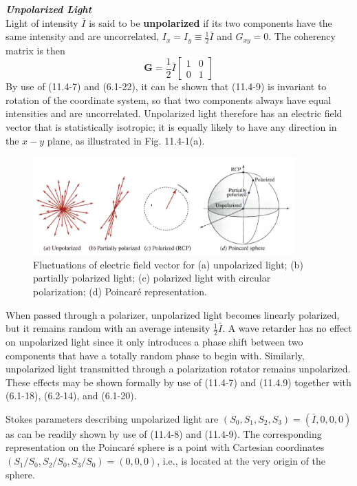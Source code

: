 \documentclass{article}
\numberwithin{figure}{subsection}
\numberwithin{table}{subsection}
\begin{document}
\bigbreak\noindent\textcolor{ksc}{\textbf{\textsl{Unpolarized Light}}}\\
Light of intensity $\bar{I}$ is said to be \textbf{unpolarized} if its two components have the same intensity and are uncorrelated, $I_x = I_y \equiv \frac{1}{2}\bar{I}$ and $G_{xy} = 0$. The coherency matrix is then
\begin{equation}
\mathbf{G} = \frac{1}{2}\bar{I}
\begin{bmatrix}
1 & 0 \\
0 & 1
\end{bmatrix}
\end{equation}
By use of (11.4-7) and (6.1-22), it can be shown that (11.4-9) is invariant to rotation of the coordinate system, so that two components always have equal intensities and are uncorrelated. Unpolarized light therefore has an electric field vector that is statistically isotropic; it is equally likely to have any direction in the $x-y$ plane, as illustrated in Fig. 11.4-1(a).
\begin{figure}[H]
\centering
\includegraphics[width=0.9\textwidth]{11_4_1.PNG}
\caption{Fluctuations of electric field vector for (a) unpolarized light; (b) partially polarized light; (c) polarized light with circular polarization; (d) Poincar\'{e} representation.}
\label{fig: 11_4_1}
\end{figure}
\par When passed through a polarizer, unpolarized light becomes linearly polarized, but it remains random with an average intensity $\frac{1}{2}\bar{I}$. A wave retarder has no effect on unpolarized light since it only introduces a phase shift between two components that have a totally random phase to begin with. Similarly, unpolarized light transmitted through a polarization rotator remains unpolarized. These effects may be shown formally by use of (11.4-7) and (11.4.9) together with (6.1-18), (6.2-14), and (6.1-20).
\par Stokes parameters describing unpolarized light are $(S_0, S_1, S_2, S_3) = (\bar{I}, 0, 0, 0)$ as can be readily shown by use of (11.4-8) and (11.4-9). The corresponding representation on the Poincar\'{e} sphere is a point with Cartesian coordinates $(S_1 / S_0, S_2 / S_0, S_3 / S_0) = (0, 0, 0)$, i.e., is located at the very origin of the sphere.
\end{document}
